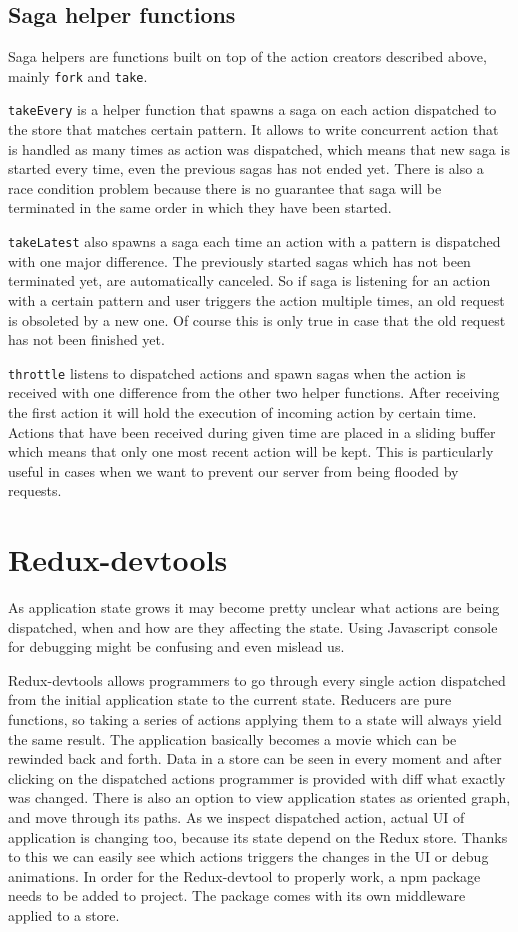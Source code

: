 \subsection{Saga helper functions}
Saga helpers are functions built on top of the action creators described above, mainly \texttt{fork} and \texttt{take}.

\texttt{takeEvery} is a helper function that spawns a saga on each action dispatched to the store that matches certain pattern. It allows to write concurrent action that is handled as many times as action was dispatched, which means that new saga is started every time, even the previous sagas has not ended yet. There is also a race condition problem because there is no guarantee that saga will be terminated in the same order in which they have been started.

\texttt{takeLatest} also spawns a saga each time an action with a pattern is dispatched with one major difference. The previously started sagas which has not been terminated yet, are automatically canceled. So if saga is listening for an action with a certain pattern and user triggers the action multiple times, an old request is obsoleted by a new one. Of course this is only true in case that the old request has not been finished yet.

\texttt{throttle} listens to dispatched actions and spawn sagas when the action is received with one difference from the other two helper functions. After receiving the first action it will hold the execution of incoming action by certain time. Actions that have been received during given time are placed in a sliding buffer which means that only one most recent action will be kept. This is particularly useful in cases when we want to prevent our server from being flooded by requests.

\section{Redux-devtools}
As application state grows it may become pretty unclear what actions are being dispatched, when and how are they affecting the state. Using Javascript console for debugging might be confusing and even mislead us.

Redux-devtools allows programmers to go through every single action dispatched from the initial application state to the current state. Reducers are pure functions, so taking a series of actions applying them to a state will always yield the same result. The application basically becomes a movie which can be rewinded back and forth. Data in a store can be seen in every moment and after clicking on the dispatched actions programmer is provided with diff what exactly was changed. There is also an option to view application states as oriented graph, and move through its paths. As we inspect dispatched action, actual UI of application is changing too, because its state depend on the Redux store. Thanks to this we can easily see which actions triggers the changes in the UI or debug animations. In order for the Redux-devtool to properly work, a npm package needs to be added to project. The package comes with its own middleware applied to a store. 

